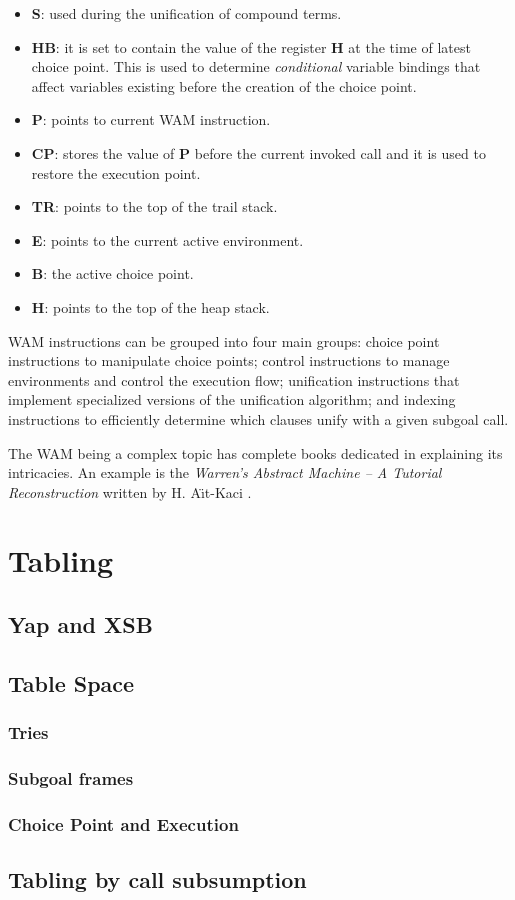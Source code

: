 \begin{itemize}
  \item \textbf{S}: used during the unification of compound terms.
  \item \textbf{HB}: it is set to contain the value of the register \textbf{H} at the time of latest choice point. This is used to
  determine \textit{conditional} variable bindings that affect variables existing before the creation of the choice point.
  \item \textbf{P}: points to current WAM instruction.
  \item \textbf{CP}: stores the value of \textbf{P} before the current invoked call and it is used to restore the execution point.
  \item \textbf{TR}: points to the top of the trail stack.
  \item \textbf{E}: points to the current active environment.
  \item \textbf{B}: the active choice point.
  \item \textbf{H}: points to the top of the heap stack.
\end{itemize}

WAM instructions can be grouped into four main groups: choice point instructions to manipulate choice points; control
instructions to manage environments and control the execution flow; unification instructions that implement
specialized versions of the unification algorithm; and indexing instructions to efficiently determine which clauses
unify with a given subgoal call.

The WAM being a complex topic has complete books dedicated in explaining its intricacies.
An example is the \textit{Warren's Abstract Machine -- A Tutorial Reconstruction} written by H. A\"{\i}t-Kaci \cite{Aitkaci-91}. 

\section{Tabling}
  \subsection{Yap and XSB}
  
  \subsection{Table Space}
    \subsubsection{Tries}
    \subsubsection{Subgoal frames}
    \subsubsection{Choice Point and Execution}
  \subsection{Tabling by call subsumption}

